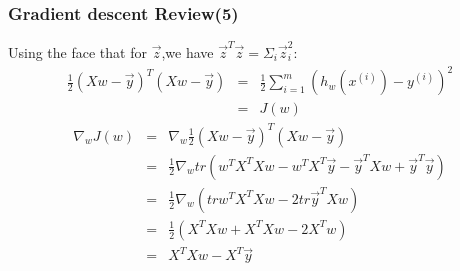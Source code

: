 \documentclass[slidestop,compress,mathserif]{beamer}
\begin{document}
    \begin{frame}[options]
        \frametitle{Gradient descent Review(5)}
        Using the face that for $\vec{z}$,we have $\vec{z}^T\vec{z}=\Sigma_i\vec{z}_i^2$:
        \begin{eqnarray*}
            \frac{1}{2}(Xw-\vec{y})^T(Xw-\vec{y}) &=& \frac{1}{2}\sum_{i=1}^m(h_w(x^{(i)})-y^{(i)})^2\\
            &=& J(w)
        \end{eqnarray*}
        \begin{eqnarray*}
            \nabla_wJ(w) &=& \nabla_w \frac{1}{2}(Xw-\vec{y})^T(Xw-\vec{y})\\
            &=& \frac{1}{2}\nabla_wtr(w^TX^TXw-w^TX^T\vec{y}-\vec{y}^TXw+\vec{y}^T\vec{y})\\
            &=& \frac{1}{2}\nabla_w(trw^TX^TXw-2tr\vec{y}^TXw)\\
            &=& \frac{1}{2}(X^TXw+X^TXw-2X^Tw)\\
            &=& X^TXw-X^T\vec{y}
        \end{eqnarray*}
    \end{frame}
\end{document}
